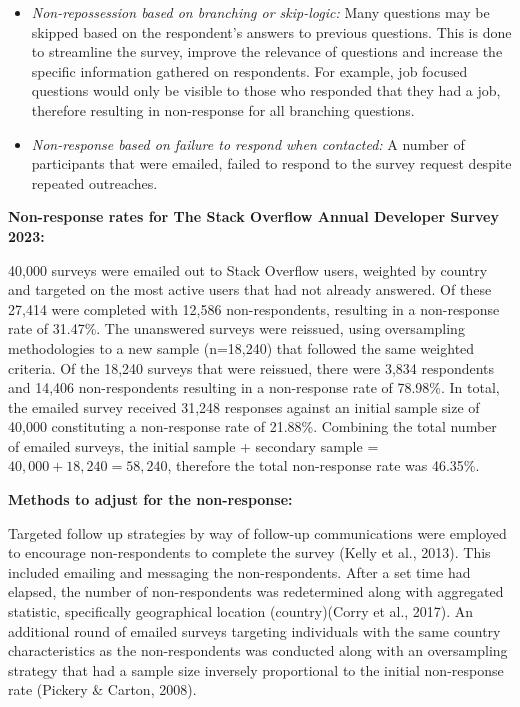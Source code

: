 \documentclass[
  12pt,
]{article}
\begin{document}
\begin{itemize}
\item
  \emph{Non-repossession based on branching or skip-logic:} Many
  questions may be skipped based on the respondent's answers to previous
  questions. This is done to streamline the survey, improve the
  relevance of questions and increase the specific information gathered
  on respondents. For example, job focused questions would only be
  visible to those who responded that they had a job, therefore
  resulting in non-response for all branching questions. \newline
\item
  \emph{Non-response based on failure to respond when contacted:} A
  number of participants that were emailed, failed to respond to the
  survey request despite repeated outreaches. \newline \newline
\end{itemize}

\textbf{Non-response rates for The Stack Overflow Annual Developer
Survey 2023:} \newline

40,000 surveys were emailed out to Stack Overflow users, weighted by
country and targeted on the most active users that had not already
answered. Of these 27,414 were completed with 12,586 non-respondents,
resulting in a non-response rate of 31.47\%. The unanswered surveys were
reissued, using oversampling methodologies to a new sample (n=18,240)
that followed the same weighted criteria. Of the 18,240 surveys that
were reissued, there were 3,834 respondents and 14,406 non-respondents
resulting in a non-response rate of 78.98\%. In total, the emailed
survey received 31,248 responses against an initial sample size of
40,000 constituting a non-response rate of 21.88\%. Combining the total
number of emailed surveys, the initial sample + secondary sample =
\(40,000 + 18,240= 58,240\), therefore the total non-response rate was
46.35\%. \newline \newline

\textbf{Methods to adjust for the non-response:} \newline

Targeted follow up strategies by way of follow-up communications were
employed to encourage non-respondents to complete the survey (Kelly et
al., 2013). This included emailing and messaging the non-respondents.
After a set time had elapsed, the number of non-respondents was
redetermined along with aggregated statistic, specifically geographical
location (country)(Corry et al., 2017). An additional round of emailed
surveys targeting individuals with the same country characteristics as
the non-respondents was conducted along with an oversampling strategy
that had a sample size inversely proportional to the initial
non-response rate (Pickery \& Carton, 2008).
\end{document}
